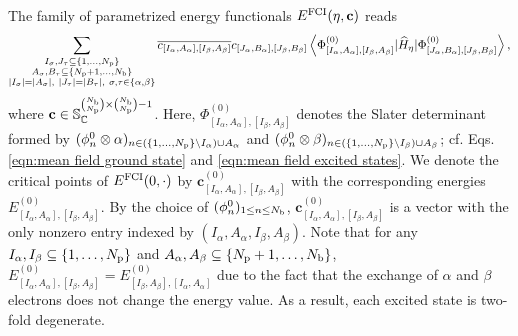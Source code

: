 \documentclass[11pt]{article}
\def\C{{\mathbb C}}
\begin{document}
The family of parametrized energy functionals $E^{\rm FCI}(\eta,\mathbf{c})$ reads
$$\sum_{\substack{I_\sigma,J_\tau\subseteq\{1,\ldots,N_{\rm p}\}\\A_\sigma,B_\tau\subseteq\{N_{\rm p}+1,\ldots,N_{\rm b}\}\\|I_\sigma|=|A_\sigma|,~|J_\tau|=|B_\tau|,~\sigma,\tau\in\{\alpha,\beta\}}}\overline{c_{[I_\alpha,A_\alpha],[I_\beta,A_\beta]}}c_{[J_\alpha,B_\alpha],[J_\beta,B_\beta]}\left\langle\Phi_{[I_\alpha,A_\alpha],[I_\beta,A_\beta]}^{(0)}|\widehat H_\eta|\Phi_{[J_\alpha,B_\alpha],[J_\beta,B_\beta]}^{(0)}\right\rangle,$$
where $\mathbf{c}\in\mathbb{S}_{\C}^{\binom{N_{\rm b}}{N_{\rm p}}\times\binom{N_{\rm b}}{N_{\rm p}}-1}$. Here, $\Phi_{[I_\alpha,A_\alpha],[I_\beta,A_\beta]}^{(0)}$ denotes the Slater determinant formed by $(\phi_n^0\otimes\alpha)_{n\in(\{1,\ldots,N_{\rm p}\}\setminus I_\alpha)\cup A_\alpha}$ and $(\phi_n^0\otimes\beta)_{n\in(\{1,\ldots,N_{\rm p}\}\setminus I_\beta)\cup A_\beta}$; cf. Eqs. \eqref{eqn:mean field ground state} and \eqref{eqn:mean field excited states}. We denote the critical points of $E^{\rm FCI}(0,\cdot)$ by $\mathbf{c}_{[I_\alpha,A_\alpha],[I_\beta,A_\beta]}^{(0)}$ with the corresponding energies $E_{[I_\alpha,A_\alpha],[I_\beta,A_\beta]}^{(0)}$. By the choice of $(\phi_n^0)_{1\le n\le N_{\rm b}}$, $\mathbf{c}_{[I_\alpha,A_\alpha],[I_\beta,A_\beta]}^{(0)}$ is a vector with the only nonzero entry indexed by $(I_\alpha,A_\alpha,I_\beta,A_\beta)$. Note that for any $I_\alpha,I_\beta\subseteq\{1,\ldots,N_{\rm p}\}$ and $A_\alpha,A_\beta\subseteq\{N_{\rm p}+1,\ldots,N_{\rm b}\}$, $E_{[I_\alpha,A_\alpha],[I_\beta,A_\beta]}^{(0)}=E_{[I_\beta,A_\beta],[I_\alpha,A_\alpha]}^{(0)}$ due to the fact that the exchange of $\alpha$ and $\beta$ electrons does not change the energy value. As a result, each excited state is two-fold degenerate. 
\end{document}
